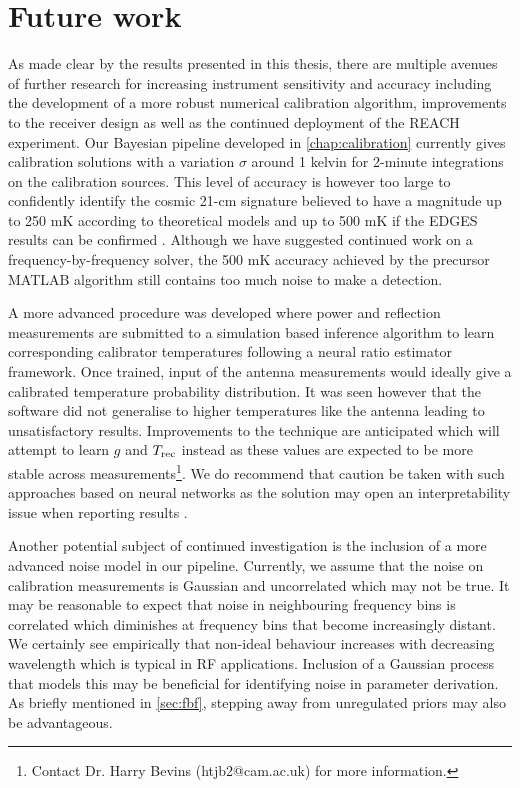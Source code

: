 \section{Future work}\label{sec:future}
As made clear by the results presented in this thesis, there are multiple avenues of further research for increasing instrument sensitivity and accuracy including the development of a more robust numerical calibration algorithm, improvements to the receiver design as well as the continued deployment of the REACH experiment. Our Bayesian pipeline developed in \cref{chap:calibration} currently gives calibration solutions with a variation $\sigma$ around 1 kelvin for 2-minute integrations on the calibration sources. This level of accuracy is however too large to confidently identify the cosmic 21-cm signature believed to have a magnitude up to 250 mK according to theoretical models and up to 500 mK if the EDGES results can be confirmed \citep{theory_models,edgesNature}. Although we have suggested continued work on a frequency-by-frequency solver, the 500 mK accuracy achieved by the precursor MATLAB algorithm still contains too much noise to make a detection.

A more advanced procedure was developed where power and reflection measurements are submitted to a simulation based inference algorithm to learn corresponding calibrator temperatures following a neural ratio estimator framework. Once trained, input of the antenna measurements would ideally give a calibrated temperature probability distribution. It was seen however that the software did not generalise to higher temperatures like the antenna leading to unsatisfactory results. Improvements to the technique are anticipated which will attempt to learn $g$ and $T_{\mathrm{rec}}$ instead as these values are expected to be more stable across measurements\footnote{Contact Dr. Harry Bevins (htjb2@cam.ac.uk) for more information.}. We do recommend that caution be taken with such approaches based on neural networks as the solution may open an interpretability issue when reporting results \citep{bb_interpret}.

Another potential subject of continued investigation is the inclusion of a more advanced noise model in our pipeline. Currently, we assume that the noise on calibration measurements is Gaussian and uncorrelated which may not be true. It may be reasonable to expect that noise in neighbouring frequency bins is correlated which diminishes at frequency bins that become increasingly distant. We certainly see empirically that non-ideal behaviour increases with decreasing wavelength which is typical in RF applications. Inclusion of a Gaussian process that models this may be beneficial for identifying noise in parameter derivation. As briefly mentioned in \cref{sec:fbf}, stepping away from unregulated priors may also be advantageous.

